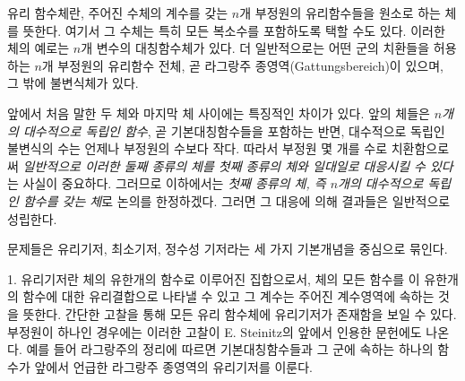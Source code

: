 
\glqq{}유리 함수체\grqq{}란, 주어진 수체의 계수를 갖는 $n$개 부정원의 유리함수들을 원소로 하는 체를 뜻한다. 여기서 그 수체는 특히 모든 복소수를 포함하도록 택할 수도 있다. 이러한 체의 예로는 $n$개 변수의 대칭함수체가 있다. 더 일반적으로는 어떤 군의 치환들을 허용하는 $n$개 부정원의 유리함수 전체, 곧 라그랑주 종영역(Gattungsbereich)이 있으며, 그 밖에 불변식체가 있다.

앞에서 처음 말한 두 체와 마지막 체 사이에는 특징적인 차이가 있다. 앞의 체들은 \emph{$n$개의 대수적으로 독립인 함수}, 곧 기본대칭함수들을 포함하는 반면, 대수적으로 독립인 불변식의 수는 언제나 부정원의 수보다 작다. 따라서 부정원 몇 개를 수로 치환함으로써 \emph{일반적으로 이러한 둘째 종류의 체를 첫째 종류의 체와 일대일로 대응시킬 수 있다}는 사실이 중요하다. 그러므로 이하에서는 \emph{첫째 종류의 체, 즉 $n$개의 대수적으로 독립인 함수를 갖는 체}로 논의를 한정하겠다. 그러면 그 대응에 의해 결과들은 일반적으로 성립한다.

문제들은 유리기저, 최소기저, 정수성 기저라는 세 가지 기본개념을 중심으로 묶인다.

1. \glqq{}유리기저\grqq{}란 체의 유한개의 함수로 이루어진 집합으로서, 체의 모든 함수를 이 유한개의 함수에 대한 유리결합으로 나타낼 수 있고 그 계수는 주어진 계수영역에 속하는 것을 뜻한다. 간단한 고찰을 통해 모든 유리 함수체에 유리기저가 존재함을 보일 수 있다. 부정원이 하나인 경우에는 이러한 고찰이 E. Steinitz의 앞에서 인용한 문헌에도 나온다. 예를 들어 라그랑주의 정리에 따르면 기본대칭함수들과 그 군에 속하는 하나의 함수가 앞에서 언급한 라그랑주 종영역의 유리기저를 이룬다.

